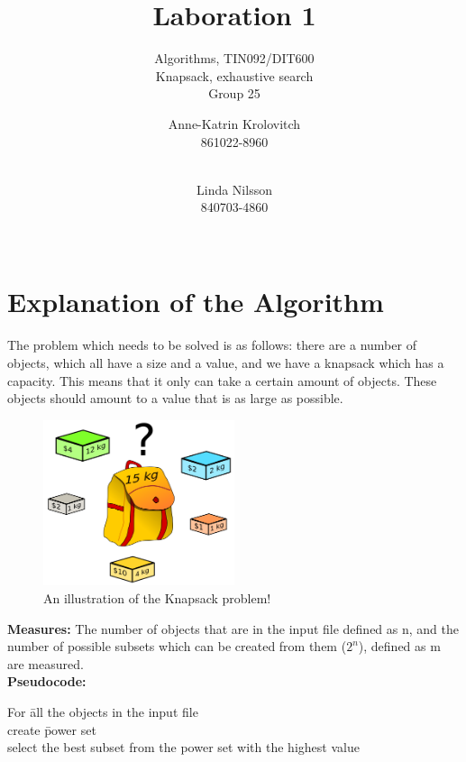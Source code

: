 \documentclass{inc/mas}
\title{Laboration 1 }
\subtitle{Algorithms, TIN092/DIT600\\ Knapsack, exhaustive search \\ Group 25}
\affiliation{}
\begin{document}
\author{Anne-Katrin Krolovitch \\ 861022-8960\\ \\ \and
Linda Nilsson \\ 840703-4860 \\ \\ \tabularnewline
}
\maketitle
\section{Explanation of the Algorithm} 
 \noindent The problem which needs to be solved is as follows: there are a number of objects, which all have a size and a value, and we have a knapsack which has a capacity. This means that it only can take a certain amount of objects. These objects should amount to a value that is as large as possible.\\

\begin{figure}[h!]
  \centering
      \includegraphics[width=0.5\textwidth]{Knapsack.png}
  \caption{An illustration of the Knapsack problem! \citep{wikipic} }
\end{figure}



\textbf{Measures:} The number of objects that are in the input file defined as n, and the number of possible subsets which can be created from them ($2^n$), defined as m are measured.\\

\noindent \textbf{Pseudocode:}
\begin{tabbing}
For \= all the objects in the input file \\
\> create \= power set	\\
\> select the best subset from the power set with the highest value\\
\end{tabbing}
\end{document}
